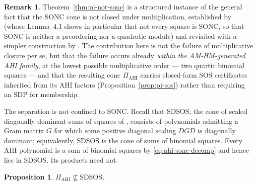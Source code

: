 \documentclass[12pt]{elsarticle}
\newtheorem{proposition}[theorem]{Proposition}
\theoremstyle{definition}
\newtheorem{remark}[theorem]{Remark}
\newcommand{\AHI}{\mathrm{AHI}}
\newcommand{\PiAHI}{\Pi_{\AHI}}
\newcommand{\SDSOS}{\mathrm{SDSOS}}
\begin{document}
\begin{remark}\label{rem:sonc-prior-art}
Theorem~\ref{thm:pi-not-sonc} is a structured instance of the general fact that the SONC cone is not closed under multiplication, established by \citet{dressler2017positivstellensatz} (whose Lemma~4.1 shows in particular that not every square is SONC, so that SONC is neither a preordering nor a quadratic module) and revisited with a simpler construction by \citet{dressler2022optimization}. The contribution here is not the failure of multiplicative closure per se, but that the failure occurs already \emph{within the AM-HM-generated AHI family}, at the lowest possible multiplicative order --- two quartic binomial squares --- and that the resulting cone $\PiAHI$ carries closed-form SOS certificates inherited from its AHI factors (Proposition~\ref{prop:pi-sos}) rather than requiring an SDP for membership.
\end{remark}

The separation is not confined to SONC. Recall that $\SDSOS$, the cone of scaled diagonally dominant sums of squares of \citet{ahmadi2019dsos}, consists of polynomials admitting a Gram matrix $G$ for which some positive diagonal scaling $DGD$ is diagonally dominant; equivalently, $\SDSOS$ is the cone of sums of binomial squares. Every AHI polynomial is a sum of binomial squares by \eqref{eq:ahi-sonc-decomp} and hence lies in $\SDSOS$. Its products need not.
\pagebreak
\begin{proposition}\label{prop:pi-not-sdsos}
$\PiAHI \not\subseteq \SDSOS$.
\end{proposition}
\end{document}
